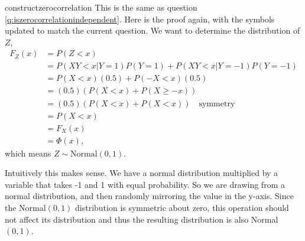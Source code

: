 \begin{answer}{constructzerocorrelation}
This is the same as question \ref{q:iszerocorrelationindependent}.
Here is the proof again, with the symbols updated to match the current question.
We want to determine the distribution of $Z$,
\begin{align*}
F_Z(x)  &= P(Z<x)  \\
&=
P( XY<x| Y = 1)P(Y=1) +
P( XY<x| Y = -1)P(Y=-1) \\
&=
P( X<x)(0.5) + P(-X<x)(0.5) \\
&=  (0.5)( P( X<x) + P(X \geq -x)) \\
&=  (0.5)( P( X<x) + P(X < x)) \quad \text{symmetry} \\
&=   P(X < x) \\
&=   F_X(x) \\
&=   \Phi(x)
\text{,}
\end{align*}
which means $Z \sim \text{Normal}(0, 1)$.

Intuitively this makes sense.
We have a normal distribution multiplied by a variable that takes -1 and 1 with equal probability.
So we are drawing from a normal distribution, and then randomly mirroring the value in the y-axis.
Since the Normal$(0,1)$ distribution is symmetric about zero, this operation should not affect its distribution and thus the resulting distribution is also Normal$(0,1)$.


\end{answer}
